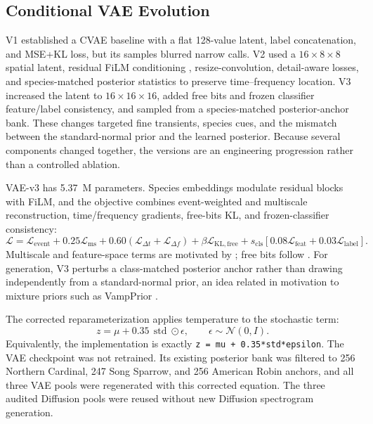 \documentclass{article}
\begin{document}
\subsection{Conditional VAE Evolution}

V1 established a CVAE baseline with a flat 128-value latent, label
concatenation, and MSE+KL loss, but its samples blurred narrow calls. V2 used a
$16\times8\times8$ spatial latent, residual FiLM conditioning
\cite{perez2018film}, resize-convolution, detail-aware losses, and
species-matched posterior statistics to preserve time--frequency location. V3
increased the latent to $16\times16\times16$, added free bits and frozen
classifier feature/label consistency, and sampled from a species-matched
posterior-anchor bank. These changes targeted fine transients, species cues, and the
mismatch between the standard-normal prior and the learned posterior. Because
several components changed together, the versions are an engineering
progression rather than a controlled ablation.

VAE-v3 has 5.37~M parameters. Species embeddings modulate residual blocks with
FiLM, and the objective combines event-weighted and multiscale reconstruction,
time/frequency gradients, free-bits KL, and frozen-classifier consistency:
\begin{equation}
\mathcal{L}=\mathcal{L}_{\mathrm{event}}+0.25\mathcal{L}_{\mathrm{ms}}
+0.60(\mathcal{L}_{\Delta t}+\mathcal{L}_{\Delta f})
+\beta\mathcal{L}_{\mathrm{KL,free}}
+s_{\mathrm{cls}}[0.08\mathcal{L}_{\mathrm{feat}}+0.03\mathcal{L}_{\mathrm{label}}].
\label{eq:vae-loss}
\end{equation}
Multiscale and feature-space terms are motivated by
\cite{mathieu2016multiscale,johnson2016perceptual}; free bits follow
\cite{kingma2016iaf}. For generation, V3 perturbs a class-matched posterior
anchor rather than drawing independently from a standard-normal prior, an idea
related in motivation to mixture priors such as VampPrior
\cite{tomczak2018vampprior}.

The corrected reparameterization applies temperature to the stochastic term:
\begin{equation}
z=\mu+0.35\,\operatorname{std}\odot\epsilon,
\qquad \epsilon\sim\mathcal{N}(0,I).
\label{eq:vae-reparameterization}
\end{equation}
Equivalently, the implementation is exactly
\texttt{z = mu + 0.35*std*epsilon}. The VAE checkpoint was not retrained. Its
existing posterior bank was filtered to 256 Northern Cardinal, 247 Song
Sparrow, and 256 American Robin anchors, and all three VAE pools were
regenerated with this corrected equation. The three audited Diffusion pools
were reused without new Diffusion spectrogram generation.
\end{document}
